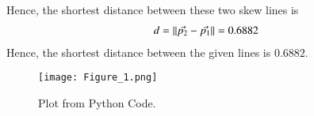 \documentclass[journal,12pt,twocolumn]{IEEEtran}
\begin{document}
Hence, the shortest distance between these two skew lines is
\begin{align}
    \label{eq:18}
    d = \lVert\Vec{p_{2}}-\Vec{p_{1}}\rVert = 0.6882
\end{align}
Hence, the shortest distance between the given lines is $0.6882$.
\begin{figure}[h]
    \centering
    \texttt{[image: Figure\_1.png]}
    \caption{Plot from Python Code.}
    \label{fig:my_label}
\end{figure}
\end{document}
